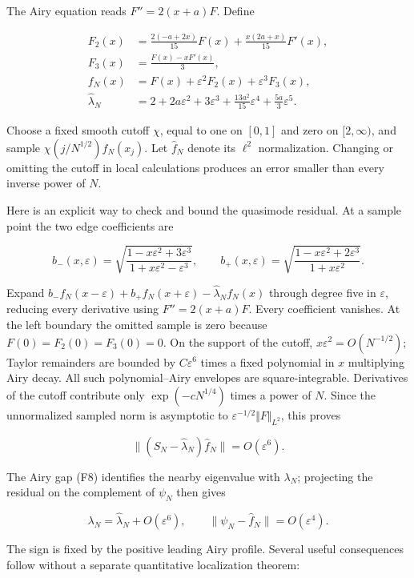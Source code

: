 \documentclass[11pt,letterpaper]{article}
\numberwithin{equation}{section}
\theoremstyle{remark}
\begin{document}
The Airy equation reads \(F''=2(x+a)F\). Define

\[
\begin{aligned}
F_2(x)&=\frac{2(-a+2x)}{15}F(x)
+\frac{x(2a+x)}{15}F'(x),\\
F_3(x)&=\frac{F(x)-xF'(x)}{3},\\
f_N(x)&=F(x)+\varepsilon^2F_2(x)+\varepsilon^3F_3(x),\\
\widehat\lambda_N&=2+2a\varepsilon^2+3\varepsilon^3
+\frac{13a^2}{15}\varepsilon^4+\frac{5a}{3}\varepsilon^5.
\end{aligned}
\tag{F9}
\]

Choose a fixed smooth cutoff \(\chi\), equal to one on \([0,1]\) and zero on \([2,\infty )\), and sample \(\chi (j/N^{1/2})f_N(x_j)\). Let \(\widehat f_N\) denote its \(\ell ^2\) normalization. Changing or omitting the cutoff in local calculations produces an error smaller than every inverse power of \(N\).

Here is an explicit way to check and bound the quasimode residual. At a sample point the two edge coefficients are

\[
b_-(x,\varepsilon)=\sqrt{\frac{1-x\varepsilon^2+3\varepsilon^3}
{1+x\varepsilon^2-\varepsilon^3}},\qquad
b_+(x,\varepsilon)=\sqrt{\frac{1-x\varepsilon^2+2\varepsilon^3}
{1+x\varepsilon^2}}.
\]

Expand \(b_- f_N(x-\varepsilon )+b_+ f_N(x+\varepsilon )-\widehat\lambda _N f_N(x)\) through degree five in \(\varepsilon\), reducing every derivative using \(F''=2(x+a)F\). Every coefficient vanishes. At the left boundary the omitted sample is zero because \(F(0)=F_2(0)=F_3(0)=0\). On the support of the cutoff, \(x\varepsilon ^2=O(N^{-1/2})\); Taylor remainders are bounded by \(C\varepsilon ^6\) times a fixed polynomial in \(x\) multiplying Airy decay. All such polynomial--Airy envelopes are square-integrable. Derivatives of the cutoff contribute only \(\exp(-cN^{1/4})\) times a power of \(N\). Since the unnormalized sampled norm is asymptotic to \(\varepsilon ^{-1/2}\Vert F\Vert _{L^2}\), this proves

\[
\|(S_N-\widehat\lambda_N)\widehat f_N\|=O(\varepsilon^6).
\tag{F10}
\]

The Airy gap (F8) identifies the nearby eigenvalue with \(\lambda _N\); projecting the residual on the complement of \(\psi _N\) then gives

\[
\lambda_N=\widehat\lambda_N+O(\varepsilon^6),\qquad
\|\psi_N-\widehat f_N\|=O(\varepsilon^4).
\tag{F11}
\]

The sign is fixed by the positive leading Airy profile. Several useful consequences follow without a separate quantitative localization theorem:
\end{document}
